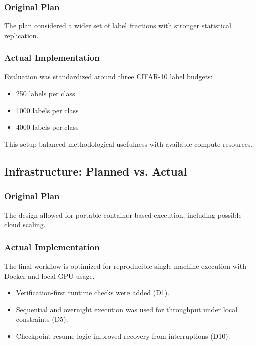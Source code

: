 \subsubsection{Original Plan}

The plan considered a wider set of label fractions with stronger statistical replication.

\subsubsection{Actual Implementation}

Evaluation was standardized around three CIFAR-10 label budgets:

\begin{itemize}
    \item 250 labels per class
    \item 1000 labels per class
    \item 4000 labels per class
\end{itemize}

This setup balanced methodological usefulness with available compute resources.

\subsection{Infrastructure: Planned vs. Actual}

\subsubsection{Original Plan}

The design allowed for portable container-based execution, including possible cloud scaling.

\subsubsection{Actual Implementation}

The final workflow is optimized for reproducible single-machine execution with Docker and local GPU usage.

\begin{itemize}
    \item Verification-first runtime checks were added (D1).
    \item Sequential and overnight execution was used for throughput under local constraints (D5).
    \item Checkpoint-resume logic improved recovery from interruptions (D10).
\end{itemize}

